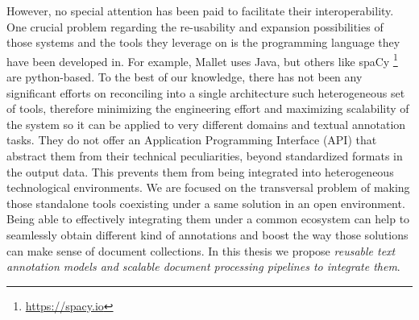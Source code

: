 However, no special attention has been paid to facilitate their interoperability. One crucial problem regarding the re-usability and expansion possibilities of those systems and the tools they leverage on is the programming language they have been developed in. For example, Mallet uses Java, but others like spaCy \footnote{\url{https://spacy.io}} are python-based. To the best of our knowledge, there has not been any significant efforts on reconciling into a single architecture such heterogeneous set of tools, therefore minimizing the engineering effort and maximizing scalability of the system so it can be applied to very different domains and textual annotation tasks. They do not offer an Application Programming Interface (API) that abstract them from their technical peculiarities, beyond standardized formats in the output data. This prevents them from being integrated into heterogeneous technological environments. We are focused on the transversal problem of making those standalone tools coexisting under a same solution in an open environment. Being able to effectively integrating  them  under a common ecosystem can help to seamlessly obtain different kind of annotations and boost the way those solutions can make sense of document collections. In this thesis we propose \textit{reusable text annotation models and scalable document processing pipelines to integrate them}.  

 
